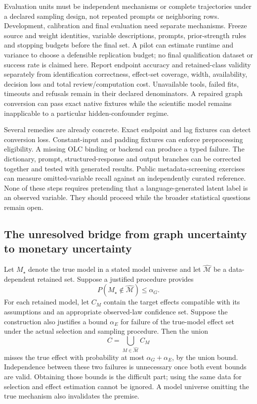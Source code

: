 Evaluation units must be independent mechanisms or complete trajectories
under a declared sampling design, not repeated prompts or neighboring rows.
Development, calibration and final evaluation need separate mechanisms.
Freeze source and weight identities, variable descriptions, prompts,
prior-strength rules and stopping budgets before the final set. A pilot can
estimate runtime and variance to choose a defensible replication budget;
no final qualification dataset or success rate is claimed here. Report
endpoint accuracy and retained-class validity separately from identification
correctness, effect-set coverage, width, availability, decision loss and
total review/computation cost. Unavailable tools, failed fits, timeouts and
refusals remain in their declared denominators. A repaired graph conversion
can pass exact native fixtures while the scientific model remains
inapplicable to a particular hidden-confounder regime.
\citep{exec15_latent_design}

Several remedies are already concrete. Exact endpoint and lag fixtures can
detect conversion loss. Constant-input and padding fixtures can enforce
preprocessing eligibility. A missing OLC binding or backend can produce a
typed failure. The dictionary, prompt, structured-response and output
branches can be corrected together and tested with generated results.
Public metadata-screening exercises can measure omitted-variable recall
against an independently curated reference. None of these steps requires
pretending that a language-generated latent label is an observed variable.
They should proceed while the broader statistical questions remain open.
\citep{exec15_latent_design}

\subsection{The unresolved bridge from graph uncertainty to monetary uncertainty}

Let $M_\star$ denote the true model in a stated model universe and let
$\widehat{\mathcal M}$ be a data-dependent retained set. Suppose a justified
procedure provides
\[
 P(M_\star\notin\widehat{\mathcal M})\leq\alpha_G.
\]
For each retained model, let $C_M$ contain the target effects compatible with
its assumptions and an appropriate observed-law confidence set. Suppose
the construction also justifies a bound $\alpha_E$ for failure of the
true-model effect set under the actual selection and sampling procedure.
Then the union
\[
 C=\bigcup_{M\in\widehat{\mathcal M}}C_M
\]
misses the true effect with probability at most $\alpha_G+\alpha_E$, by the
union bound. Independence between these two failures is unnecessary once
both event bounds are valid. Obtaining those bounds is the difficult part;
using the same data for selection and effect estimation cannot be ignored.
A model universe omitting the true mechanism also invalidates the premise.
\citep{exec15_latent_exact,exec15_latent_design}

